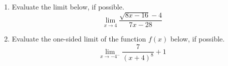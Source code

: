 \documentclass[14pt]{extbook}
\begin{document}
\begin{enumerate}
{\begin{center}
\end{center}
} \newpage
\item{
Evaluate the limit below, if possible.\[ \lim_{x \rightarrow 4} \frac{\sqrt{8x - 16} - 4}{7x - 28} \]} \newpage
\item{
Evaluate the one-sided limit of the function $f(x)$ below, if possible.\[ \lim_{x \rightarrow -4^-} \frac{7}{(x+4)^8}+1 \]} \newpage
\end{enumerate}
\end{document}
